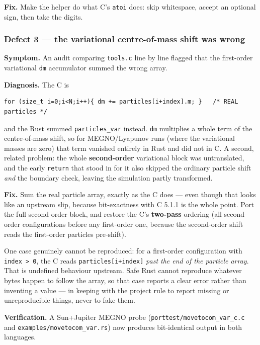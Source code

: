 \documentclass[11pt]{article}
\begin{document}
\textbf{Fix.} Make the helper do what C's \texttt{atoi} does: skip whitespace, accept an optional sign, then take the digits.

\subsubsection{Defect 3 --- the variational centre-of-mass shift was wrong}

\textbf{Symptom.} An audit comparing \texttt{tools.c} line by line flagged that the first-order variational \texttt{dm} accumulator summed the wrong array.

\textbf{Diagnosis.} The C is

\begin{lstlisting}
for (size_t i=0;i<N;i++){ dm += particles[i+index].m; }   /* REAL particles */
\end{lstlisting}

and the Rust summed \texttt{particles\_var} instead. \texttt{dm} multiplies a whole term of the centre-of-mass shift, so for MEGNO/Lyapunov runs (where the variational masses are zero) that term vanished entirely in Rust and did not in C. A second, related problem: the whole \textbf{second-order} variational block was untranslated, and the early \texttt{return} that stood in for it also skipped the ordinary particle shift \emph{and} the boundary check, leaving the simulation partly transformed.

\textbf{Fix.} Sum the real particle array, exactly as the C does --- even though that looks like an upstream slip, because bit-exactness with C 5.1.1 is the whole point. Port the full second-order block, and restore the C's \textbf{two-pass} ordering (all second-order configurations before any first-order one, because the second-order shift reads the first-order particles pre-shift).

One case genuinely cannot be reproduced: for a first-order configuration with \texttt{index > 0}, the C reads \texttt{particles[i+index]} \emph{past the end of the particle array}. That is undefined behaviour upstream. Safe Rust cannot reproduce whatever bytes happen to follow the array, so that case reports a clear error rather than inventing a value --- in keeping with the project rule to report missing or unreproducible things, never to fake them.

\textbf{Verification.} A Sun+Jupiter MEGNO probe (\texttt{porttest/movetocom\_var\_c.c} and \texttt{examples/movetocom\_var.rs}) now produces bit-identical output in both languages.
\end{document}
